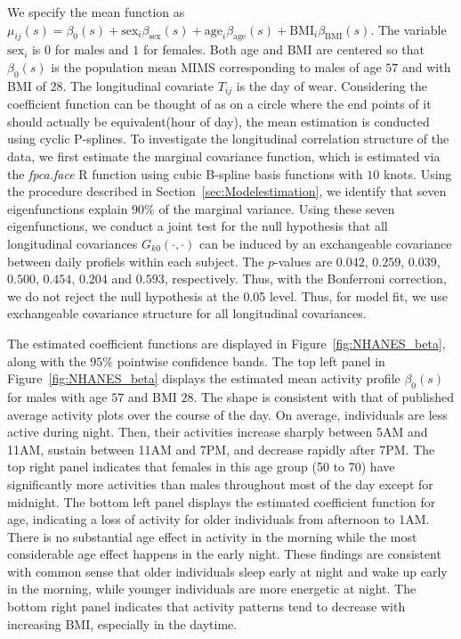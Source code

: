 \documentclass[submit]{smj}
\begin{document}
We specify the mean function as $\mu_{ij}(s) = \beta_0(s) + \text{sex}_i\beta_{\text{sex}}(s) + \text{age}_{i}\beta_{\text{age}}(s) + \text{BMI}_{i}\beta_{\text{BMI}}(s)$. The variable $\text{sex}_i$ is $0$ for males and $1$ for females. Both age and BMI are centered so that $\beta_0(s)$ is the population mean MIMS corresponding to males of age $57$ and with BMI of $28$. The longitudinal covariate $T_{ij}$ is the day of wear. Considering the coefficient function can be thought of as on a circle where the end points of it should actually be equivalent(hour of day), the mean estimation is conducted using cyclic P-splines. To investigate the longitudinal correlation structure of the data,  we first estimate the marginal covariance function, which is estimated via the  {\it fpca.face} R function using cubic B-spline basis functions with $10$ knots. Using the procedure described in Section~\ref{sec:Modelestimation}, we identify that seven eigenfunctions explain $90\%$ of the marginal variance. Using these seven eigenfunctions, we conduct a joint test for the null hypothesis that all longitudinal covariances $G_{k0}(\cdot,\cdot)$ can be induced by an exchangeable covariance between daily profiels within each subject. The $p$-values are $0.042$, $0.259$, $0.039$, $0.500$, $0.454$, $0.204$ and $0.593$, respectively. Thus, with the Bonferroni correction, we do not reject the null hypothesis at the 0.05 level. Thus, for model fit, we use exchangeable covariance structure for all longitudinal covariances.



The estimated coefficient functions are displayed in Figure~\ref{fig:NHANES_beta}, along with the $95\%$ pointwise confidence bands. The top left panel in Figure~\ref{fig:NHANES_beta} displays the estimated mean activity profile $\beta_0(s)$ for males with age $57$ and BMI $28$. The shape is consistent with that of published average activity plots over the course of the day. On average, individuals are less active during night. Then, their activities  increase sharply between 5AM and 11AM, sustain between 11AM and 7PM, and decrease rapidly after 7PM. The top right panel indicates that females in this age group (50 to 70) have significantly more activities than males throughout most of the day except for midnight. The bottom left panel displays the estimated coefficient function for age, indicating a loss of activity for older individuals from afternoon to 1AM. There is no substantial age effect in activity in the morning  while the most considerable age effect happens in the early night. These findings are consistent with common sense that older individuals sleep early at night and wake up early in the morning, while younger individuals are more energetic at night. The bottom right panel indicates that activity patterns tend to decrease with increasing BMI, especially in the daytime.  
\end{document}
